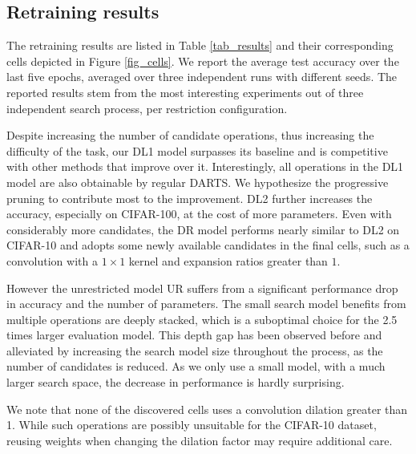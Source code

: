 \documentclass[conference]{IEEEtran}
\begin{document}
\begin{figure*}[htbp]
	\caption{Discovered cells in the presented experiments in Table \ref{tab_results}, all convolutions are separable. The nodes $B_j$ (blue) sum their inputs, the average of all nodes is the cell output (orange). The operations are plotted above their respective graph edges.}
	\label{fig_cells}
\end{figure*}




\subsection{Retraining results}
\label{ss_results_retraining}

The retraining results are listed in Table \ref{tab_results} and their corresponding cells depicted in Figure \ref{fig_cells}. We report the average test accuracy over the last five epochs, averaged over three independent runs with different seeds. The reported results stem from the most interesting experiments out of three independent search process, per restriction configuration.

Despite increasing the number of candidate operations, thus increasing the difficulty of the task, our DL1 model surpasses its baseline and is competitive with other methods that improve over it. Interestingly, all operations in the DL1 model are also obtainable by regular DARTS. We hypothesize the progressive pruning to contribute most to the improvement.
DL2 further increases the accuracy, especially on CIFAR-100, at the cost of more parameters. Even with considerably more candidates, the DR model performs nearly similar to DL2 on CIFAR-10 and adopts some newly available candidates in the final cells, such as a convolution with a $1 \times 1$ kernel and expansion ratios greater than $1$. 

However the unrestricted model UR suffers from a significant performance drop in accuracy and the number of parameters. The small search model benefits from multiple operations are deeply stacked, which is a suboptimal choice for the 2.5 times larger evaluation model. This depth gap \cite{nas_pdarts} has been observed before and alleviated by increasing the search model size throughout the process, as the number of candidates is reduced. As we only use a small model, with a  much larger search space, the decrease in performance is hardly surprising.

We note that none of the discovered cells uses a convolution dilation greater than 1. While such operations are possibly unsuitable for the CIFAR-10 dataset, reusing weights when changing the dilation factor may require additional care.
\end{document}

